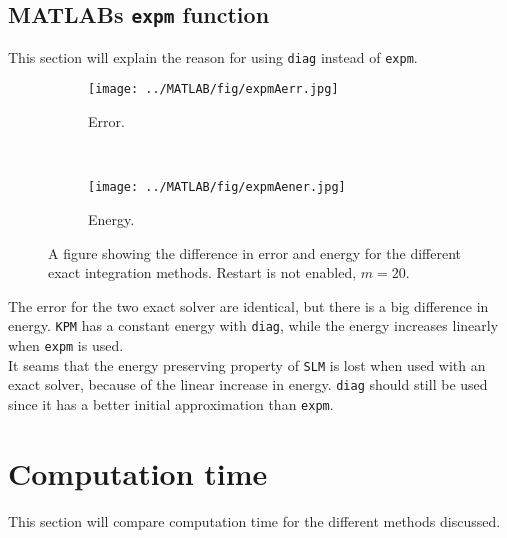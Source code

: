 \subsection{MATLABs \texttt{expm} function} \label{sec:resultexpm} %
This section will explain the reason for using \texttt{diag} instead of \texttt{expm}.
\begin{figure}[H]
        \centering
		\begin{subfigure}[b]{0.45\textwidth}
                \texttt{[image: ../MATLAB/fig/expmAerr.jpg]}
                \caption{ Error. }
                \label{fig:expmSerr}
        \end{subfigure}%
        ~
        \begin{subfigure}[b]{0.45\textwidth}
                \texttt{[image: ../MATLAB/fig/expmAener.jpg]}
                \caption{ Energy. }
                \label{fig:expmSener}
        \end{subfigure}
        \caption{A figure showing the difference in error and energy for the different exact integration methods. Restart is not enabled, $m = 20$. }
        \label{fig:expm}
\end{figure}
\noindent The error for the two exact solver are identical, but there is a big difference in energy. \texttt{KPM} has a constant energy with \texttt{diag}, while the energy increases linearly when \texttt{expm} is used.\\
It seams that the energy preserving property of \texttt{SLM} is lost when used with an exact solver, because of the linear increase in energy. \texttt{diag} should still be used since it has a better initial approximation than \texttt{expm}. \\
\section{Computation time}%
\label{sec:cruntime}
This section will compare computation time for the different methods discussed. 


